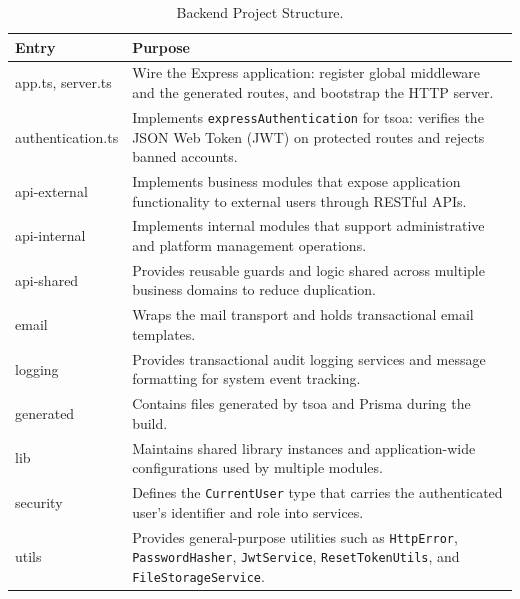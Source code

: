 \begin{table}[H]
	\centering
	\caption{Backend Project Structure.}
	\label{tab:backend-folders}
	\begin{tabular}{|p{3.2cm}|p{10.8cm}|}
		\hline
		\textbf{Entry} & \textbf{Purpose} \\
		\hline
		
		app.ts, server.ts &
		Wire the Express application: register global middleware and the generated routes, and bootstrap the HTTP server. \\
		\hline
		
		authentication.ts &
		Implements \texttt{expressAuthentication} for tsoa: verifies the JSON Web Token (JWT) on protected routes and rejects banned accounts. \\
		\hline
		
		api-external &
		Implements business modules that expose application functionality to external users through RESTful APIs. \\
		\hline
		
		api-internal &
		Implements internal modules that support administrative and platform management operations. \\
		\hline
		
		api-shared &
		Provides reusable guards and logic shared across multiple business domains to reduce duplication. \\
		\hline
		
		email &
		Wraps the mail transport and holds transactional email templates. \\
		\hline
		
		logging &
		Provides transactional audit logging services and message formatting for system event tracking. \\
		\hline
		
		generated &
		Contains files generated by tsoa and Prisma during the build. \\
		\hline
		
		lib &
		Maintains shared library instances and application-wide configurations used by multiple modules. \\
		\hline
		
		security &
		Defines the \texttt{CurrentUser} type that carries the authenticated user's identifier and role into services. \\
		\hline
		
		utils &
		Provides general-purpose utilities such as \texttt{HttpError}, \texttt{PasswordHasher}, \texttt{JwtService}, \texttt{ResetTokenUtils}, and \texttt{FileStorageService}. \\
		\hline
		
	\end{tabular}
\end{table}

